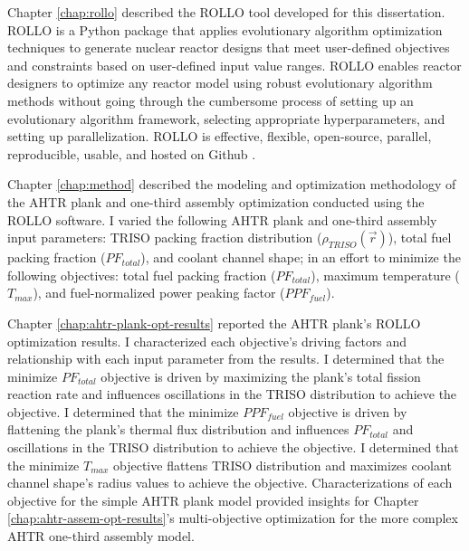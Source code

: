 Chapter \ref{chap:rollo} described the \gls{ROLLO} tool developed for this 
dissertation. 
\gls{ROLLO} is a Python package that applies evolutionary algorithm 
optimization techniques to generate nuclear reactor designs that meet user-defined 
objectives and constraints based on user-defined input value ranges. 
\gls{ROLLO} enables reactor designers to optimize any reactor model using robust 
evolutionary algorithm methods without going through the cumbersome process of setting up 
an evolutionary algorithm framework, selecting appropriate hyperparameters, and 
setting up parallelization.
\gls{ROLLO} is effective, flexible, open-source, parallel, reproducible, usable, and 
hosted on Github \cite{chee_rollo_2021}. 

Chapter \ref{chap:method} described the modeling and optimization methodology of the 
\gls{AHTR} plank and one-third assembly optimization conducted using the \gls{ROLLO} 
software.
I varied the following \gls{AHTR} plank and one-third assembly input parameters: 
\gls{TRISO} packing fraction distribution ($\rho_{TRISO}(\vec{r})$), total fuel 
packing fraction ($PF_{total}$), and coolant channel shape; in an effort to minimize 
the following objectives: total fuel packing fraction ($PF_{total}$), maximum 
temperature ($T_{max}$), and fuel-normalized power peaking factor ($PPF_{fuel}$). 

Chapter \ref{chap:ahtr-plank-opt-results} reported the \gls{AHTR} plank's 
\gls{ROLLO} optimization results.
I characterized each objective's driving factors and relationship 
with each input parameter from the results. 
I determined that the minimize $PF_{total}$ objective is driven by maximizing the plank's 
total fission reaction rate and influences oscillations in the TRISO distribution to 
achieve the objective. 
I determined that the minimize $PPF_{fuel}$ objective is driven by flattening the plank's
thermal flux distribution and influences $PF_{total}$ and oscillations in the TRISO 
distribution to achieve the objective.
I determined that the minimize $T_{max}$ objective flattens TRISO distribution and 
maximizes coolant channel shape's radius values to achieve the objective.
Characterizations of each objective for the simple \gls{AHTR} plank model provided 
insights for Chapter \ref{chap:ahtr-assem-opt-results}'s multi-objective 
optimization for the more complex \gls{AHTR} one-third assembly model. 

